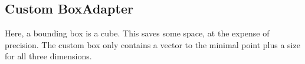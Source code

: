 \subsection*{Custom BoxAdapter }
Here, a bounding box is a cube. This saves some space, at the expense of precision. The custom box only contains a vector to the minimal point plus a size for all three dimensions.



